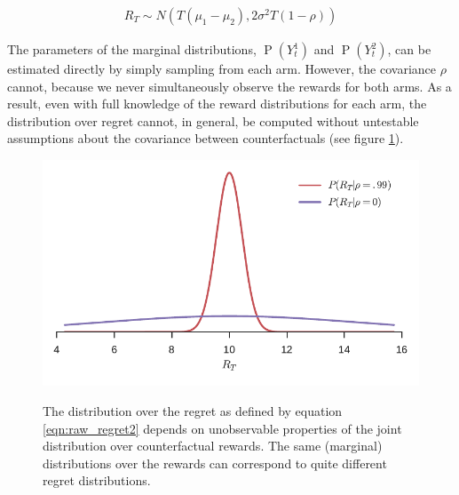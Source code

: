 \documentclass[11pt,a4paper,twoside]{report}
\newcommand{\eqn}[1]{\begin{align}#1\end{align}}
\renewcommand{\P}[1]{\operatorname{P}\left(#1\right)}
\newcommand{\cfb}[2]{{#1}_t^{#2}} %
\newcommand{\rawregret}{R_{T}} %
\theoremstyle{plain}
\theoremstyle{definition}
\begin{document}
\eqn{
\rawregret \sim N\left(T(\mu_1 - \mu_2), 2\sigma^2 T(1-\rho)\right)
}

The parameters of the marginal distributions, $\P{\cfb{Y}{1}}$ and $\P{\cfb{Y}{2}}$, can be estimated directly by simply sampling from each arm. However, the covariance $\rho$ cannot, because we never simultaneously observe the rewards for both arms. As a result, even with full knowledge of the reward distributions for each arm, the distribution over regret cannot, in general, be computed without untestable assumptions about the covariance between counterfactuals (see figure \ref{fig:metaphysical_distribution_difference}). 

\begin{figure}[ht]
\captionsetup[subfigure]{position=b}
\centering
{}
\hspace{0.02\textwidth}
{\includegraphics[width=.45\linewidth]{figures/counterfactual_nonidentify_b.pdf}}
\caption{The distribution over the regret as defined by equation \ref{eqn:raw_regret2} depends on unobservable properties of the joint distribution over counterfactual rewards. The same (marginal) distributions over the rewards can correspond to quite different regret distributions.}
\label{fig:metaphysical_distribution_difference}
\end{figure}
\end{document}
